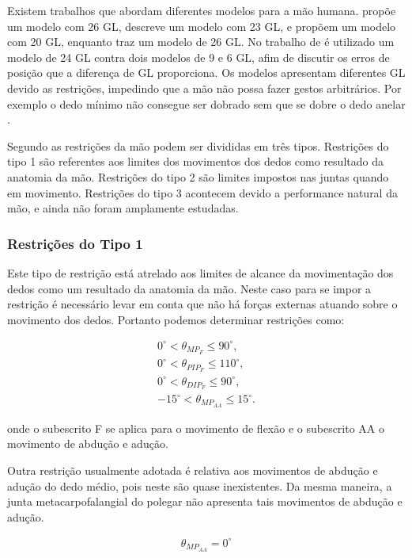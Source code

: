 Existem trabalhos que abordam diferentes modelos para a mão humana.  \cite{bray2005stochastic} propõe um modelo com 26 GL, \cite{kuch1994human} descreve um modelo com 23 GL, \cite{chalfoun2004muscle} e \cite{renault2001dynamic} propõem um modelo com 20 GL, enquanto \cite{du20073d} traz um modelo de 26 GL. No trabalho de \cite{cobos2008efficient} é utilizado um modelo de 24 GL contra dois modelos de 9 e 6 GL, afim de discutir os erros de posição que a diferença de GL proporciona. Os modelos apresentam diferentes GL devido as restrições, impedindo que a mão não possa fazer gestos arbitrários. Por exemplo o dedo mínimo não consegue ser dobrado sem que se dobre o dedo anelar \cite{lin2000modeling}.

Segundo \cite{lin2000modeling} as restrições da mão podem ser divididas em três tipos. Restrições do tipo 1 são referentes aos limites dos movimentos dos dedos como resultado da anatomia da mão. Restrições do tipo 2 são limites impostos nas juntas quando em movimento. Restrições do tipo 3 acontecem devido a performance natural da mão, e ainda não foram amplamente estudadas.

\subsubsection{Restrições do Tipo 1}\label{Tipo 1}
Este tipo de restrição está atrelado aos limites de alcance da movimentação dos dedos como um resultado da anatomia da mão. Neste caso para se impor a restrição é necessário levar em conta que não há forças externas atuando sobre o movimento dos dedos. Portanto podemos determinar restrições como:

\begin{align}
0^\circ < \theta_{MP_F} \leq 90^\circ, \\
0^\circ < \theta_{PIP_F} \leq 110^\circ, \\
0^\circ < \theta_{DIP_F} \leq 90^\circ, \\
-15^\circ < \theta_{MP_{AA}} \leq 15^\circ.
\end{align}

onde o subescrito F se aplica para o movimento de flexão e o subescrito AA o movimento de abdução e adução.

Outra restrição usualmente adotada é relativa aos movimentos de abdução e adução do dedo médio, pois neste são quase inexistentes. Da mesma maneira, a junta metacarpofalangial do polegar não apresenta tais movimentos de abdução e adução.

\begin{align}
\theta_{MP_{AA}} = 0^\circ
\end{align}

